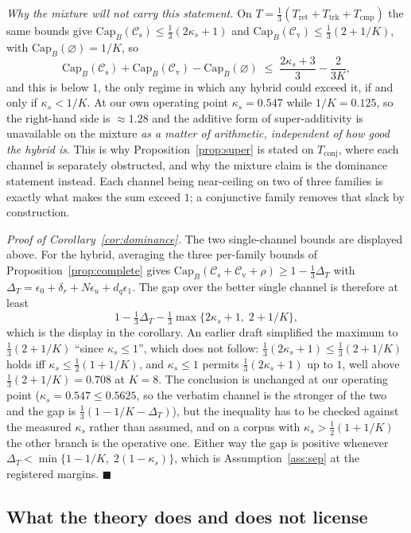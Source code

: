 \documentclass[10pt]{article}
\theoremstyle{definition}
\theoremstyle{plain}
\newcommand{\qedmark}{\ensuremath{\blacksquare}}
\newcommand{\proofend}{\unskip\nobreak\hfill\qedmark}
\renewcommand{\Cap}{\mathrm{Cap}}
\newcommand{\cs}{\mathcal{C}_{\mathrm{s}}}
\newcommand{\cv}{\mathcal{C}_{\mathrm{v}}}
\begin{document}
\emph{Why the mixture will not carry this statement.} On $T=\tfrac13(T_{\mathrm{ret}}+T_{\mathrm{trk}}+T_{\mathrm{cmp}})$ the same bounds give $\Cap_B(\cs)\le\tfrac13(2\kappa_s+1)$ and $\Cap_B(\cv)\le\tfrac13(2+1/K)$, with $\Cap_B(\varnothing)=1/K$, so
\[
\Cap_B(\cs)+\Cap_B(\cv)-\Cap_B(\varnothing)\;\le\;\frac{2\kappa_s+3}{3}-\frac{2}{3K},
\]
and this is below $1$, the only regime in which any hybrid could exceed it, if and only if $\kappa_s<1/K$. At our own operating point $\kappa_s=0.547$ while $1/K=0.125$, so the right-hand side is $\approx1.28$ and the additive form of super-additivity is unavailable on the mixture \emph{as a matter of arithmetic, independent of how good the hybrid is}. This is why Proposition~\ref{prop:super} is stated on $T_{\mathrm{conj}}$, where each channel is separately obstructed, and why the mixture claim is the dominance statement instead. Each channel being near-ceiling on two of three families is exactly what makes the sum exceed $1$; a conjunctive family removes that slack by construction.

\emph{Proof of Corollary~\ref{cor:dominance}.} The two single-channel bounds are displayed above. For the hybrid, averaging the three per-family bounds of Proposition~\ref{prop:complete} gives $\Cap_B(\cs{+}\cv{+}\rho)\ge1-\tfrac13\Delta_T$ with $\Delta_T=\epsilon_0+\delta_r+N\epsilon_u+d_q\epsilon_1$. The gap over the better single channel is therefore at least
\[
1-\tfrac13\Delta_T-\tfrac13\max\{2\kappa_s+1,\;2+1/K\},
\]
which is the display in the corollary. An earlier draft simplified the maximum to $\tfrac13(2+1/K)$ ``since $\kappa_s\le1$'', which does not follow: $\tfrac13(2\kappa_s+1)\le\tfrac13(2+1/K)$ holds iff $\kappa_s\le\tfrac12(1+1/K)$, and $\kappa_s\le1$ permits $\tfrac13(2\kappa_s+1)$ up to $1$, well above $\tfrac13(2+1/K)=0.708$ at $K{=}8$. The conclusion is unchanged at our operating point ($\kappa_s=0.547\le0.5625$, so the verbatim channel is the stronger of the two and the gap is $\tfrac13(1-1/K-\Delta_T)$), but the inequality has to be checked against the measured $\kappa_s$ rather than assumed, and on a corpus with $\kappa_s>\tfrac12(1+1/K)$ the other branch is the operative one. Either way the gap is positive whenever $\Delta_T<\min\{1-1/K,\;2(1-\kappa_s)\}$, which is Assumption~\ref{ass:sep} at the registered margins. \proofend

\subsection{What the theory does and does not license}
\label{app:scope}
\end{document}

